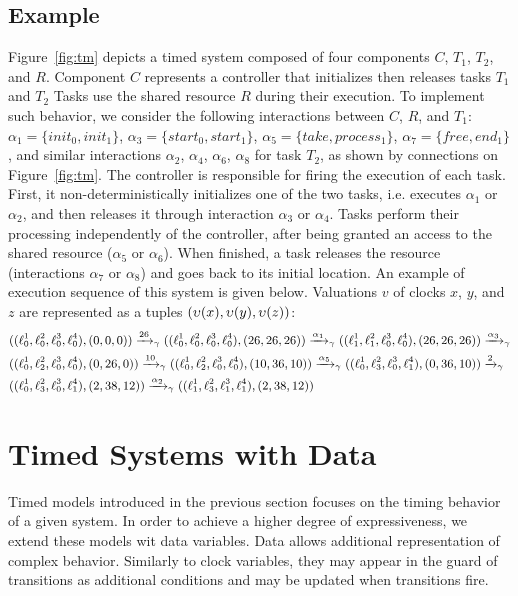 \subsection{Example}\label{exp:run}

Figure~\ref{fig:tm} depicts a timed system composed of four components $C$, $T_1$, $T_2$, 
and $R$.
Component $C$ represents a  controller that initializes then releases tasks $T_1$ and $T_2$
Tasks use the shared resource $R$ during their execution.
To implement such behavior, we consider the following interactions between $C$, $R$, and 
$T_1$: $\alpha_1=\{init_0, init_1\}$,
$\alpha_3=\{start_0, start_1\}$, $\alpha_5=\{ take, process_1\}$, $\alpha_7 = 
\{free, end_1 \}$, 
and similar interactions $\alpha_2$, $\alpha_4$, $\alpha_6$, $\alpha_8$ for task $T_2$, 
as shown by connections on Figure~\ref{fig:tm}.
The controller is responsible for firing
the execution of each task. First, it non-deterministically initializes one
of the two tasks, i.e. executes $\alpha_1$ or $\alpha_2$, and then
releases it through interaction $\alpha_3$ or $\alpha_4$.
Tasks perform their processing independently of the controller, after being granted an access 
to the shared resource ($\alpha_5$ or $\alpha_6$).
When finished, a task releases the resource (interactions $\alpha_7$ or $\alpha_8$) and goes 
back to its initial location.
An example of execution sequence of this system is given below. Valuations $v$ of clocks $x$, 
$y$, and $z$ are represented as a tuples 
$(\upsilon(x),\upsilon(y),\upsilon(z))$:
\begin{displaymath}
\small{
\begin{split}
&((\ell_0^1,\ell_0^2,\ell_0^3,\ell_0^4),(0,0,0))\xrightarrow{26}_{\gamma}
((\ell_0^1,\ell_0^2,\ell_0^3,\ell_0^4),(26,26,26))\xrightarrow{\alpha_1}_{\gamma}
((\ell_1^1,\ell_1^2,\ell_0^3,\ell_0^4),(26,26,26))\xrightarrow{\alpha_3}_{\gamma}\\
&((\ell_0^1,\ell_2^2,\ell_0^3,\ell_0^4),(0,26,0))\xrightarrow{10}_{\gamma}
((\ell_0^1,\ell_2^2,\ell_0^3,\ell_0^4),(10,36,10))\xrightarrow{\alpha_5}_{\gamma}
((\ell_0^1,\ell_3^2,\ell_0^3,\ell_1^4),(0,36,10))\xrightarrow{2}_{\gamma}\\&
((\ell_0^1,\ell_3^2,\ell_0^3,\ell_1^4),(2,38,12))\xrightarrow{\alpha_2}_{\gamma}
((\ell_1^1,\ell_3^2,\ell_1^3,\ell_1^4),(2,38,12))
\end{split}
}
\end{displaymath}

\section{Timed Systems with Data}
Timed models introduced in the previous section focuses on the timing behavior of a given system.
In order to achieve a higher degree of expressiveness, we extend these models wit data variables.
Data allows additional representation of complex behavior. Similarly to clock variables, they may
appear in the guard of transitions as additional conditions and may be updated when transitions
fire.

